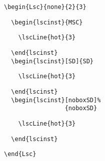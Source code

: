 \documentclass{article}
\begin{document}
\begin{center}%
\begin{minipage}{0.625\textwidth}%
\end{minipage}%
\hfill%
\begin{minipage}{0.375\textwidth}%
\small%
{\gray%
\begin{verbatim}
\begin{Lsc}{none}{2}{3}
\end{verbatim}}%
\verbunskip%
\begin{verbatim}
  \begin{lscinst}{MSC}
\end{verbatim}%
\verbunskip%
{\gray\begin{verbatim}
    \lscLine{hot}{3}
\end{verbatim}}%
\verbunskip%
\begin{verbatim}
  \end{lscinst}
  \begin{lscinst}[SD]{SD}
\end{verbatim}%
\verbunskip%
{\gray\begin{verbatim}
    \lscLine{hot}{3}
\end{verbatim}}%
\verbunskip%
\begin{verbatim}
  \end{lscinst}
  \begin{lscinst}[noboxSD]%
                 {noboxSD}
\end{verbatim}%
\verbunskip%
{\gray\begin{verbatim}
    \lscLine{hot}{3}
\end{verbatim}}%
\verbunskip%
\begin{verbatim}
  \end{lscinst}
\end{verbatim}%
\verbunskip%
{\gray%
\begin{verbatim}
\end{Lsc}
\end{verbatim}}
\end{minipage}
\end{center}%
\end{document}
